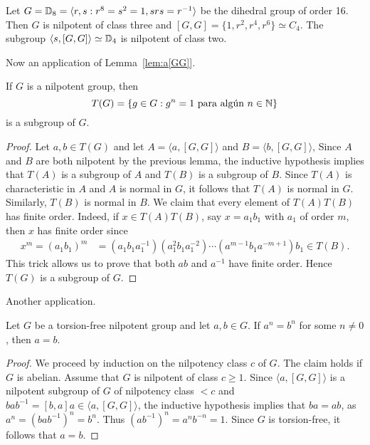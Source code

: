 \begin{example}
	Let $G=\mathbb{D}_{8}=\langle r,s:r^{8}=s^2=1,srs=r^{-1}\rangle$ be the dihedral group of order 
	16. Then $G$ is nilpotent of class three and 
	$[G,G]=\{1,r^2,r^4,r^6\}\simeq C_4$. The subgroup $\langle
	s,[G,G]\rangle\simeq\mathbb{D}_4$ is nilpotent of class two.
\end{example}

Now an application of Lemma~\ref{lem:a[GG]}. 

\begin{theorem}
	\label{thm:T(nilpotent)}
	If $G$ is a nilpotent group, then 
	\[
	T(G)=\{g\in G:g^n=1\text{ para algún $n\in\mathbb{N}$}\}
	\]
	is a subgroup of $G$. 
\end{theorem}

\begin{proof}
	Let $a,b\in T(G)$ and let $A=\langle a,[G,G]\rangle$ and $B=\langle b,[G,G]\rangle$, 
	Since $A$ and $B$ are both nilpotent by the previous lemma, the inductive hypothesis implies that
	$T(A)$ is a subgroup of $A$ and $T(B)$ is a subgroup of $B$. 
	Since $T(A)$ is characteristic in $A$ and $A$ is normal in $G$, it follows that 
	$T(A)$ is
	normal in $G$. Similarly, $T(B)$ is normal in $B$.  
	We claim that every element of $T(A)T(B)$ has finite order. Indeed, if 
	$x\in T(A)T(B)$, say $x=a_1b_1$ with 
	$a_1$ of order $m$, then $x$ has finite order since  
	\begin{align*}
	x^m=(a_1b_1)^m&=
		(a_1b_1a_1^{-1})(a_1^2b_1a_1^{-2})\cdots (a^{m-1} b_1 a^{-m+1})b_1\in T(B).
	\end{align*}
	This trick allows us to prove that both $ab$ and $a^{-1}$ have finite order. 
	Hence $T(G)$ is a subgroup of $G$. 
\end{proof}

Another application.

\begin{theorem}
	\label{thm:a=b}
	Let $G$ be a torsion-free nilpotent group and let $a,b\in G$. If $a^n=b^n$ for some 
	$n\ne 0$, then $a=b$.
\end{theorem}

\begin{proof}
	We proceed by induction on the nilpotency class $c$ of $G$. The claim holds if $G$ is abelian. Assume 
	that $G$ is nilpotent of class $c\geq1$. Since $\langle a,[G,G]\rangle$ is a nilpotent subgroup of
	$G$ of nilpotency class $<c$ and $bab^{-1}=[b,a]a\in \langle
	a,[G,G]\rangle$, the inductive hypothesis implies that $ba=ab$, as  
	$a^n=(bab^{-1})^n=b^n$. Thus $(ab^{-1})^n=a^nb^{-n}=1$. Since $G$ is torsion-free, it follows that $a=b$.
\end{proof}

